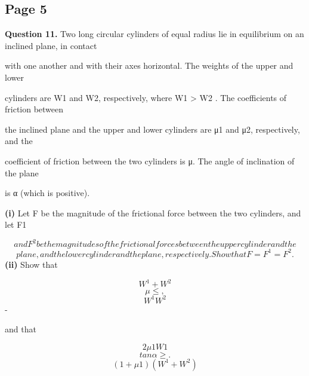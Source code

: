 \documentclass[12pt]{article}
\begin{document}
\subsection*{Page 5}
\begin{flushleft}
\bigskip\textbf{Question 11.} Two long circular cylinders of equal radius lie in equilibrium on an inclined plane, in contact\par
with one another and with their axes horizontal. The weights of the upper and lower\par
cylinders are W1 and W2, respectively, where W1 > W2 . The coefficients of friction between\par
the inclined plane and the upper and lower cylinders are μ1 and μ2, respectively, and the\par
coefficient of friction between the two cylinders is μ. The angle of inclination of the plane\par
is α (which is positive).\par
\textbf{(i)} Let F be the magnitude of the frictional force between the two cylinders, and let F1\par
\[and F^2 be the magnitudes of the frictional forces between the upper cylinder and the\]
\[plane, and the lower cylinder and the plane, respectively. Show that F = F^1 = F^2 .\]
\textbf{(ii)} Show that\par
\[W^1 + W^2\]
\[μ \leq ,\]
\[W^1 W^2\]
-\par
and that\par
\[2μ1W1\]
\[tan α \geq .\]
\[(1 + μ1)(W^1 + W^2)\]
\end{flushleft}
\end{document}
